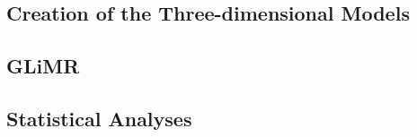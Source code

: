 \chapter{}

\section{Creation of the Three-dimensional Models}

\section{GLiMR}

\section{Statistical Analyses}
